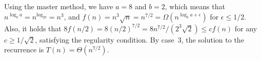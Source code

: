 Using the master method, we have $a=8$ and $b=2$, which means that $n^{\log_ba}=n^{\log_28}=n^3$, and $f(n)=n^3\!\sqrt{n}=n^{7/2}=\Omega(n^{\log_ba+\epsilon})$ for $\epsilon\le1/2$.
Also, it holds that $8f(n/2)=8(n/2)^{7/2}=8n^{7/2}/(2^3\!\sqrt{2})\le cf(n)$ for any $c\ge1/\!\sqrt{2}$, satisfying the regularity condition.
By case~3, the solution to the recurrence is $T(n)=\Theta(n^{7/2})$.
